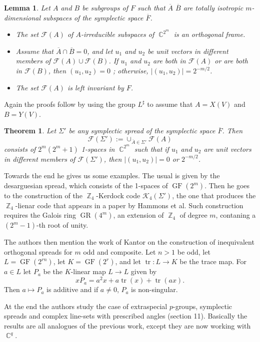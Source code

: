 \documentclass[a4paper]{article}
\DeclareMathOperator{\C}{\mathbb{C}}
\DeclareMathOperator{\Z}{\mathbb{Z}}
\DeclareMathOperator{\tr}{tr}
\DeclareMathOperator{\GF}{GF}
\DeclareMathOperator{\GR}{GR}
\newtheorem{theorem}{Theorem}
\newtheorem{lemma}{Lemma}
\begin{document}
  \begin{lemma}
    Let $A$ and $B$ be subgroups of $F$ such that
    $\overline{A}$ $\overline{B}$ are totally isotropic
    $m$-dimensional subspaces of the symplectic space
    $\overline{F}$.
    \begin{itemize}
      \item The set $\mathcal F(A)$ of $A$-irreducible
        subspaces of $\C^{2^{m}}$ is an orthogonal frame.
      \item Assume that $\overline{A} \cap \overline{B} =
        0$, and let $u_1$ and $u_2$ be unit vectors in
        different members of $\mathcal F(A) \cup \mathcal
        F(B)$. If $u_1$ and $u_2$ are both in $\mathcal
        F(A)$ or are both in $\mathcal F(B)$, then
        $(u_1,u_2) = 0$ ; otherwise, $|(u_1,u_2)| = 2^{-m /
        2}$.
      \item The set $\mathcal F(A)$ is left invariant by
        $F$.
    \end{itemize}
  \end{lemma}
  Again the proofs follow by using the group $L^{\sharp}$ to
  assume that $A = X(V)$ and $B = Y(V)$.

  \begin{theorem}
    Let $\Sigma'$ be any symplectic spread of the symplectic
    space $\overline{F}$. Then
    \[
      \mathcal F(\Sigma')
      := \cup_{\overline{A} \in \Sigma'}
      \mathcal F(A)
    \] 
    consists of $2^{m}(2^{m}+1)$ 1-spaces in $\C^{2^{m}}$ 
    such that if $u_1$ and $u_2$ are unit vectors in
    different members of $\mathcal F(\Sigma')$, then
    $|(u_1,u_2)| = 0$ or $2^{-m / 2}$.
  \end{theorem}

  Towards the end he gives us some examples. The usual is
  given by the desarguesian spread, which consists of the
  1-spaces of $\GF(2^{m})$. Then he goes to the construction
  of the $\Z_4$-Kerdock code $\mathcal K_4(\Sigma')$, the
  one that produces the $\Z_4$-lienar code that appears in a
  paper by Hammons et al. Such construction requires the
  Galois ring $\GR(4^{m})$, an extension of $\Z_4$ of degree
  $m$, contaning a $(2^{m}-1)$-th root of unity.

  The authors then mention the work of Kantor on the
  construction of inequivalent orthogonal spreads for $m$ 
  odd and composite. Let $n > 1$ be odd, let $L =
  \GF(2^{rn})$, let $K = \GF(2^{r})$, and let $\tr: L \to K$ 
  be the trace map. For $a \in L$ let $P_a$ be the
  $K$-linear map $L \to L$ given by
  \[
    xP_a = a^2 x + a \tr(x) + \tr(ax).
  \] 
  Then $a \mapsto P_a$ is additive and if $a \neq 0$, $P_a$ 
  is non-singular. 

  At the end the authors study the case of extraspecial
  $p$-groups, symplectic spreads and complex line-sets with
  prescribed angles (section 11). Basically the results are
  all analogues of the previous work, except they are now
  working with $\C^{q}$. 
\end{document}
